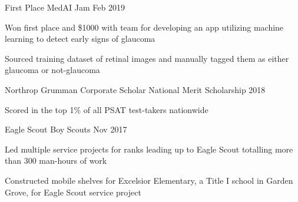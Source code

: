 
\begin{cventries}
  \cventry
    {First Place} %
    {MedAI Jam} %
    {} %
    {Feb 2019} %
    {
      \begin{cvitems}
        \item {Won first place and \$1000 with team for developing an app utilizing machine learning to detect early signs of glaucoma}
        \item {Sourced training dataset of retinal images and manually tagged them as either glaucoma or not-glaucoma}
      \end{cvitems}
    } %

  \cventry
    {Northrop Grumman Corporate Scholar}
    {National Merit Scholarship}
    {}
    {2018}
    {
      \begin{cvitems}
        \item {Scored in the top 1\% of all PSAT test-takers nationwide}
      \end{cvitems}
    }  
    
  \cventry
    {Eagle Scout}
    {Boy Scouts}
    {}
    {Nov 2017}
    {
      \begin{cvitems}
        \item {Led multiple service projects for ranks leading up to Eagle Scout totalling more than 300 man-hours of work}
        \item {Constructed mobile shelves for Excelsior Elementary, a Title I school in Garden Grove, for Eagle Scout service project}
      \end{cvitems}
    }

\end{cventries}
